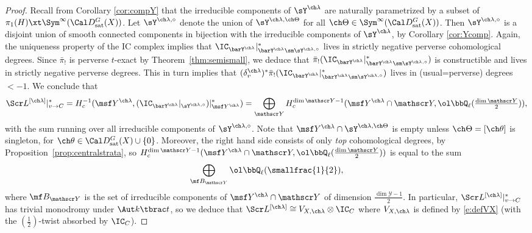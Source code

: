 \begin{proof}
Recall from Corollary \ref{cor:compY} that the irreducible components of $\sY^{\ch\lambda}$ are naturally parametrized by a subset of $\pi_1(H) \xt \Sym^\infty(\Cal D^G_{\mathrm{sat}}(X))$.
Let $\sY^{\ch\lambda,\circ}$ denote the union of $\sY^{\ch\lambda,\ch\Theta}$
for all $\ch\Theta \in \Sym^\infty(\Cal D^G_{\mathrm{sat}}(X))$.
Then $\sY^{\ch\lambda,\circ}$ is a disjoint union of smooth connected components
in bijection with the irreducible components of $\sY^{\ch\lambda}$, by Corollary \ref{cor:Ycomp}.
Again, the uniqueness property of the IC complex implies that
$\IC_{\barY^{\ch\lambda}}|^*_{\barY^{\ch\lambda}\sm \sY^{\ch\lambda,\circ}}$
lives in strictly negative perverse cohomological degrees.
Since $\bar\pi_!$ is perverse $t$-exact by Theorem~\ref{thm:semismall}, we
deduce that
$\bar\pi_!( \IC_{\barY^{\ch\lambda}}|^*_{\barY^{\ch\lambda}\sm \sY^{\ch\lambda,\circ}} )$
is constructible and lives in strictly negative perverse degrees.
This in turn implies that $(\delta^{\ch\lambda}_v)^* \bar\pi_!( \IC_{\barY^{\ch\lambda}}|^*_{\barY^{\ch\lambda}\sm \sY^{\ch\lambda,\circ}} )$ lives in (usual=perverse) degrees $<-1$.
We conclude that
\[
    \Scr L^{[\ch\lambda]}|^*_{v\to C} =
    H^{-1}_c(\msf Y^{\ch\lambda}, (\IC_{\barY^{\ch\lambda}}|_{\sY^{\ch\lambda,\circ}})|^*_{\msf Y^{\ch\lambda}} ) =
\bigoplus_{\mathscr Y} H_c^{\dim \mathscr Y - 1}(\msf Y^{\ch\lambda} \cap \mathscr Y, \ol\bbQ_\ell({\textstyle \frac{\dim \mathscr Y}{2}})),\]
with the sum running over all irreducible components of $\sY^{\ch\lambda,\circ}$.
Note that $\msf Y^{\ch\lambda}\cap \sY^{\ch\lambda,\ch\Theta}$ is empty unless
$\ch\Theta = [\ch\theta]$ is singleton, for $\ch\theta \in \Cal D^G_{\mathrm{sat}}(X) \cup \{0\}$.
Moreover, the right hand side consists of only \emph{top} cohomological degrees, by Proposition~\ref{prop:centralstrata}, so
$H_c^{\dim \mathscr Y - 1}(\msf Y^{\ch\lambda} \cap \mathscr Y, \ol\bbQ_\ell (\frac{\dim \mathscr Y}{2}))$
is equal to the sum
\[\bigoplus_{\mf B_{\mathscr Y}} \ol\bbQ_\ell(\smallfrac{1}{2}),\]
where $\mf B_{\mathscr Y}$ is the set of irreducible components of $\msf Y^{\ch\lambda}\cap \mathscr Y$ of dimension $\frac{\dim \mathscr Y - 1}{2}$.
In particular, $\Scr L^{[\ch\lambda]}|^*_{v\to C}$ has trivial monodromy under $\Aut k\tbrac t$,
so we  deduce that $\Scr L^{[\ch\lambda]} \cong V_{X,\ch\lambda} \otimes
\IC_C$ where $V_{X,\ch\lambda}$ is defined by \eqref{e:defVX} (with the $(\frac{1}{2})$-twist absorbed by $\IC_C$).


\end{proof}
